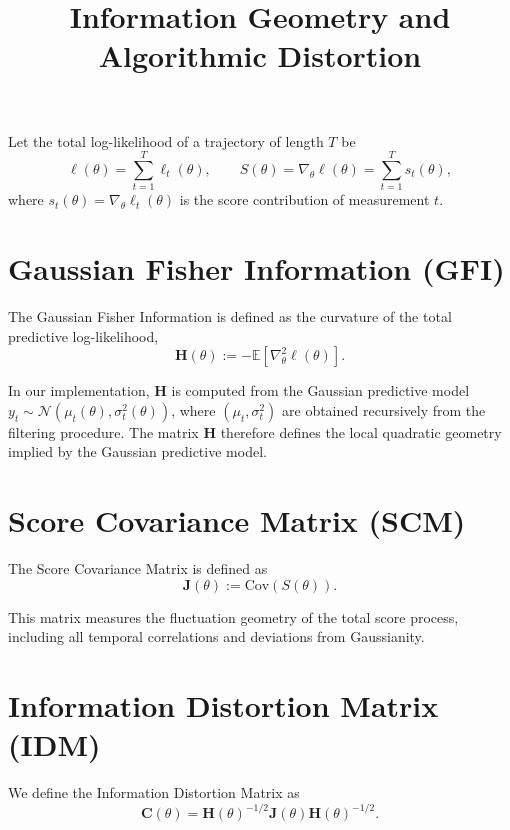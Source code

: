 \documentclass[11pt]{article}
\title{Information Geometry and Algorithmic Distortion}
\author{}
\date{}
\begin{document}
\maketitle

Let the total log-likelihood of a trajectory of length $T$ be
\begin{equation}
\ell(\theta) = \sum_{t=1}^T \ell_t(\theta),
\qquad
S(\theta) = \nabla_\theta \ell(\theta) = \sum_{t=1}^T s_t(\theta),
\end{equation}
where $s_t(\theta) = \nabla_\theta \ell_t(\theta)$ is the score contribution of measurement $t$.

\section*{Gaussian Fisher Information (GFI)}

The Gaussian Fisher Information is defined as the curvature of the total predictive log-likelihood,
\begin{equation}
\mathbf H(\theta) := -\mathbb{E}\left[ \nabla_\theta^2 \ell(\theta) \right].
\end{equation}

In our implementation, $\mathbf H$ is computed from the Gaussian predictive model
$y_t \sim \mathcal{N}(\mu_t(\theta), \sigma_t^2(\theta))$,
where $(\mu_t,\sigma_t^2)$ are obtained recursively from the filtering procedure.
The matrix $\mathbf H$ therefore defines the local quadratic geometry implied by the Gaussian predictive model.

\section*{Score Covariance Matrix (SCM)}

The Score Covariance Matrix is defined as
\begin{equation}
\mathbf J(\theta) := \mathrm{Cov}\!\left( S(\theta) \right).
\end{equation}

This matrix measures the fluctuation geometry of the total score process,
including all temporal correlations and deviations from Gaussianity.

\section*{Information Distortion Matrix (IDM)}

We define the Information Distortion Matrix as
\begin{equation}
\mathbf C(\theta)
=
\mathbf H(\theta)^{-1/2}
\mathbf J(\theta)
\mathbf H(\theta)^{-1/2}.
\end{equation}
\end{document}
